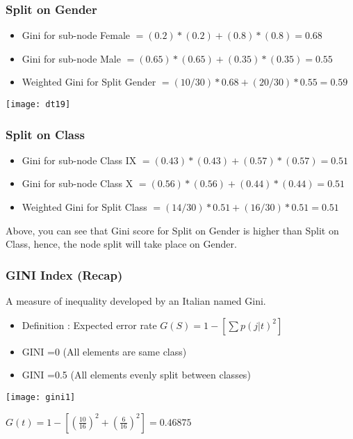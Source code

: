 \begin{frame}[fragile]\frametitle{Split on Gender}
\begin{itemize}
\item Gini for sub-node Female $= (0.2)*(0.2)+(0.8)*(0.8)=0.68$
\item Gini for sub-node Male $= (0.65)*(0.65)+(0.35)*(0.35)=0.55$
\item Weighted Gini for Split Gender $= (10/30)*0.68+(20/30)*0.55 = 0.59$
\end{itemize}
\begin{center}
\texttt{[image: dt19]}
\end{center}
\end{frame}

\begin{frame}[fragile]\frametitle{Split on Class}
\begin{itemize}
\item Gini for sub-node Class IX $= (0.43)*(0.43)+(0.57)*(0.57)=0.51$
\item Gini for sub-node Class X $= (0.56)*(0.56)+(0.44)*(0.44)=0.51$
\item Weighted Gini for Split Class $= (14/30)*0.51+(16/30)*0.51 = 0.51$
\end{itemize}
Above, you can see that Gini score for Split on Gender is higher than Split on Class, hence, the node split will take place on Gender.
\end{frame}

\begin{frame}[fragile]\frametitle{GINI Index (Recap)}
A measure of inequality developed by an Italian named Gini.
\begin{itemize}
\item Definition : Expected error rate
$G(S) = 1 - [\sum p(j|t)^2]$
\item GINI =0 (All elements are same class)
\item  GINI =0.5 (All elements evenly split between classes)
\end{itemize}
\begin{center}
\texttt{[image: gini1]}
\end{center}

$G(t) = 1 - [(\frac{10}{16})^2 + (\frac{6}{16})^2] = 0.46875$
\end{frame}

